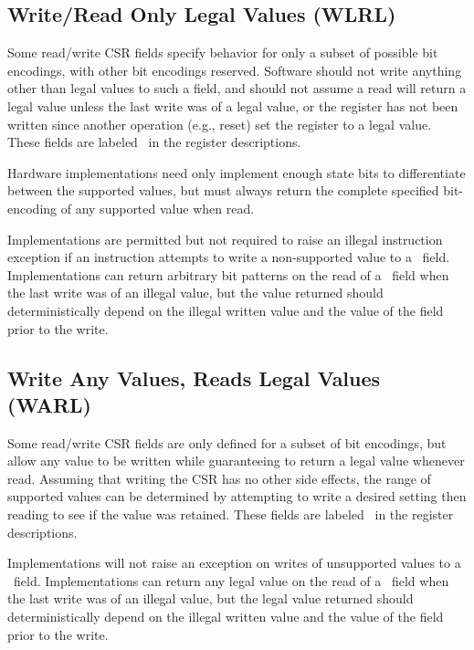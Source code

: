 \subsection*{Write/Read Only Legal Values (WLRL)}

Some read/write CSR fields specify behavior for only a subset of
possible bit encodings, with other bit encodings reserved.  Software
should not write anything other than legal values to such a field, and
should not assume a read will return a legal value unless the last
write was of a legal value, or the register has not been written since
another operation (e.g., reset) set the register to a legal value.
These fields are labeled \wlrl\ in the register descriptions.

\begin{commentary}
Hardware implementations need only implement enough state bits to
differentiate between the supported values, but must always return the
complete specified bit-encoding of any supported value when read.
\end{commentary}

Implementations are permitted but not required to raise an illegal
instruction exception if an instruction attempts to write a
non-supported value to a \wlrl\ field.  Implementations can
return arbitrary bit patterns on the read of a \wlrl\ field when the last
write was of an illegal value, but the value returned should
deterministically depend on the illegal written value and
the value of the field prior to the write.

\subsection*{Write Any Values, Reads Legal Values (WARL)}

Some read/write CSR fields are only defined for a subset of bit
encodings, but allow any value to be written while guaranteeing to
return a legal value whenever read.  Assuming that writing the CSR has
no other side effects, the range of supported values can be determined
by attempting to write a desired setting then reading to see if the
value was retained.  These fields are labeled \warl\ in the register
descriptions.

Implementations will not raise an exception on writes of unsupported
values to a \warl\ field.  Implementations can
return any legal value on the read of a \warl\ field when the last
write was of an illegal value, but the legal value returned should
deterministically depend on the illegal written value and
the value of the field prior to the write.


